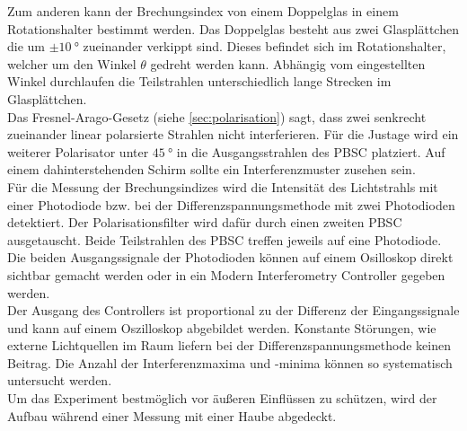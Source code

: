 Zum anderen kann der Brechungsindex von einem Doppelglas in einem Rotationshalter bestimmt werden.
Das Doppelglas besteht aus zwei Glasplättchen die um $\pm \qty{10}{\degree}$ zueinander verkippt sind.
Dieses befindet sich im Rotationshalter, welcher um den Winkel $\theta$ gedreht werden kann.
Abhängig vom eingestellten Winkel durchlaufen die Teilstrahlen unterschiedlich lange Strecken im Glasplättchen.
\\
Das Fresnel-Arago-Gesetz (siehe \autoref{sec:polarisation}) sagt, dass zwei senkrecht zueinander linear polarsierte Strahlen nicht interferieren.
Für die Justage wird ein weiterer Polarisator unter $\qty{45}{\degree}$ in die Ausgangsstrahlen des PBSC platziert.
Auf einem dahinterstehenden Schirm sollte ein Interferenzmuster zusehen sein.
\\
Für die Messung der Brechungsindizes wird die Intensität des Lichtstrahls mit einer Photodiode bzw. bei der Differenzspannungsmethode mit zwei Photodioden detektiert.
Der Polarisationsfilter wird dafür durch einen zweiten PBSC ausgetauscht.
Beide Teilstrahlen des PBSC treffen jeweils auf eine Photodiode.
Die beiden Ausgangssignale der Photodioden können auf einem Osilloskop direkt sichtbar gemacht werden oder in ein Modern Interferometry Controller gegeben werden.
\\
Der Ausgang des Controllers ist proportional zu der Differenz der Eingangssignale und kann auf einem Oszilloskop abgebildet werden.
Konstante Störungen, wie externe Lichtquellen im Raum liefern bei der Differenzspannungsmethode keinen Beitrag.
Die Anzahl der Interferenzmaxima und -minima können so systematisch untersucht werden.
\\
Um das Experiment bestmöglich vor äußeren Einflüssen zu schützen, wird der Aufbau während einer Messung mit einer Haube abgedeckt.